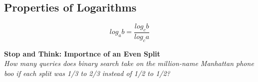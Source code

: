 \subsection{Properties of Logarithms}

$$log_{a}b = \frac{log_{c}b}{log_{c}a}$$

\textbf{Stop and Think: Importnce of an Even Split} \\

\emph{How many queries does binary search take on the million-name Manhattan phone boo if each split was 1/3 to 2/3 instead of 1/2 to 1/2?}
